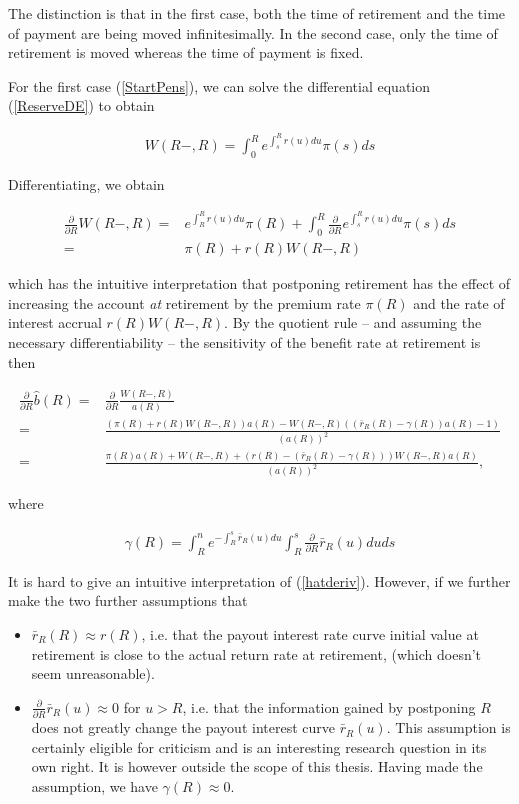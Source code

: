 \documentclass{book}
\newcommand{\1}[1]{\mathbbm{1}_{\left\lbrace #1 \right\rbrace}}
\theoremstyle{break}
\theoremstyle{remark}
\numberwithin{equation}{section}
\begin{document}
The distinction is that in the first case, both the time of retirement and the time of payment are being moved infinitesimally. In the second case, only the time of retirement is moved whereas the time of payment is fixed.

For the first case (\ref{StartPens}), we can solve the differential equation (\ref{ReserveDE}) to obtain

\begin{align} \label{ReserveAtRetirement}
	W(R-,R) = \int_0^R e^{\int_s^R r(u) du} \pi(s) ds
\end{align}

Differentiating, we obtain

\begin{align*}
	\frac{\partial}{\partial R} W(R-,R) =& e^{\int_R^R r(u) du} \pi(R) + \int_0^R \frac{\partial}{\partial R} e^{\int_s^R r(u) du} \pi(s) ds \\
	=& \pi(R) + r(R) W(R-,R)
\end{align*}

which has the intuitive interpretation that postponing retirement has the effect of increasing the account \textit{at} retirement by the premium rate $\pi(R)$ and the rate of interest accrual $r(R) W(R-,R)$. By the quotient rule -- and assuming the necessary differentiability -- the sensitivity of the benefit rate at retirement is then

\begin{align} \label{hatderiv}
	\frac{\partial}{\partial R} \hat{b}(R) =& \frac{\partial}{\partial R} \frac{W(R-,R)}{a(R)} \nonumber \\
	=& \frac{\left( \pi(R) + r(R) W(R-,R) \right) a(R) - W(R-,R) \left( \left( \bar{r}_R(R) - \gamma(R) \right) a(R) - 1 \right)}{\left( a(R) \right)^2} \nonumber \\
	=& \frac{\pi(R) a(R)  + W(R-,R) + \left( r(R) - \left( \bar{r}_R(R) - \gamma(R) \right) \right) W(R-,R) a(R)}{\left( a(R) \right)^2},
\end{align}

where

\begin{align*}
	\gamma(R) = \int_R^n e^{-\int_R^s \bar{r}_R(u) du} \int_R^s 	\frac{\partial}{\partial R} \bar{r}_R(u) du ds
\end{align*}

It is hard to give an intuitive interpretation of (\ref{hatderiv}). However, if we further make the two further assumptions that

\begin{itemize}
	\item $\bar{r}_R (R) \approx r (R)$, i.e. that the payout interest rate curve initial value at retirement is close to the actual return rate at retirement, (which doesn't seem unreasonable).
	\item $\frac{\partial}{\partial R} \bar{r}_R(u) \approx 0$ for $u > R$, i.e. that the information gained by postponing $R$ does not greatly change the payout interest curve $\bar{r}_R(u)$. This assumption is certainly eligible for criticism and is an interesting research question in its own right. It is however outside the scope of this thesis. Having made the assumption, we have $\gamma(R) \approx 0$.
\end{itemize}
\end{document}

